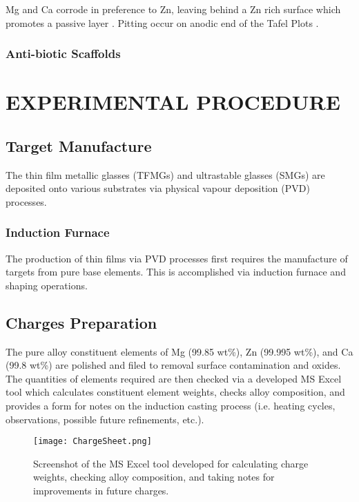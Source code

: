 \documentclass[a4paper,12pt,oneside]{report}%
\begin{document}
Mg and Ca corrode in preference to Zn, leaving behind a Zn rich surface which promotes a passive layer \cite{Wang2012}.
Pitting occur on anodic end of the Tafel Plots \cite{Schluter2012}.

\subsection{Anti-biotic Scaffolds}

\chapter{EXPERIMENTAL PROCEDURE}
\section{Target Manufacture}
The thin film metallic glasses (TFMGs) and ultrastable glasses (SMGs) are deposited onto various substrates via physical vapour deposition (PVD) processes.

\subsection{Induction Furnace} 
The production of thin films via PVD processes first requires the manufacture of targets from pure base elements. This is accomplished via induction furnace and shaping operations. 

\section{Charges Preparation}
The pure alloy constituent elements of Mg (99.85 wt\%), Zn (99.995 wt\%), and Ca (99.8 wt\%) are polished and filed to removal surface contamination and oxides. The quantities of elements required are then checked via a developed MS Excel tool which calculates constituent element weights, checks alloy composition, and provides a form for notes on the induction casting process (i.e. heating cycles, observations, possible future refinements, etc.).

\begin{figure}[htbp]
	\centering
	\texttt{[image: ChargeSheet.png]}
	\caption{Screenshot of the MS Excel tool developed for calculating charge weights, checking alloy composition, and taking notes for improvements in future charges.}
	\label{fig:ChargeSheet}
\end{figure}
\end{document}
